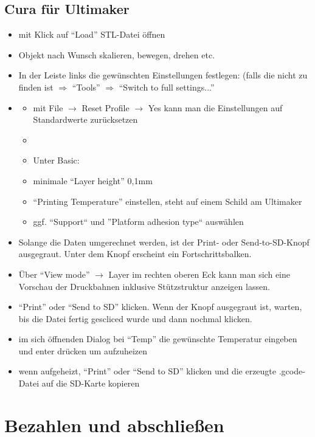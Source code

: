 \documentclass{\basedir/fablab-document}
\begin{document}
\subsection{Cura für Ultimaker}
\begin{itemize}
\item mit Klick auf ``Load'' STL-Datei öffnen
\item Objekt nach Wunsch skalieren, bewegen, drehen etc.
\item In der Leiste links die gewünschten Einstellungen festlegen: (falls die nicht zu finden ist $\Rightarrow$ ``Tools'' $\Rightarrow$ ``Switch to full settings...''
\item {}
 \begin{itemize}
  \item mit File $\rightarrow$ Reset Profile $\rightarrow$ Yes kann man die Einstellungen auf Standardwerte zurücksetzen
  \item {}
  \item Unter Basic:
  \item minimale ``Layer height'' 0,1mm
  \item ``Printing Temperature'' einstellen, steht auf einem Schild am Ultimaker
  \item ggf. ``Support`` und ''Platform adhesion type`` auswählen
 \end{itemize}
\item Solange die Daten umgerechnet werden, ist der Print- oder Send-to-SD-Knopf ausgegraut. Unter dem Knopf erscheint ein Fortschrittsbalken.
\item Über \enquote{View mode} $\rightarrow$ Layer im rechten oberen Eck kann man sich eine Vorschau der Druckbahnen inklusive Stützstruktur anzeigen lassen.
\item ``Print'' oder ``Send to SD'' klicken. Wenn der Knopf ausgegraut ist, warten, bis die Datei fertig gescliced wurde und dann nochmal klicken.
\item im sich öffnenden Dialog bei ``Temp'' die gewünschte Temperatur eingeben und enter drücken um aufzuheizen
\item wenn aufgeheizt, ``Print'' oder ``Send to SD'' klicken und die erzeugte .gcode-Datei auf die SD-Karte kopieren
\end{itemize}

\section{Bezahlen und abschließen}
\end{document}
